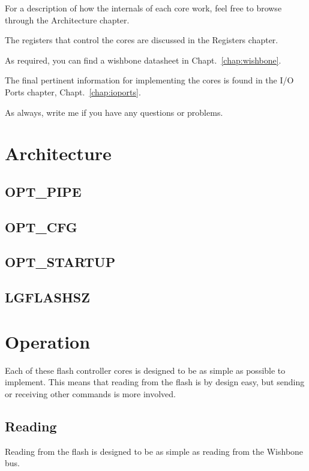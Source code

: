 \documentclass{gqtekspec}
\begin{document}
For a description of how the internals of each core work, feel free to browse
through the Architecture chapter.

The registers that control the cores are discussed in the Registers chapter.

As required, you can find a wishbone datasheet in Chapt.~\ref{chap:wishbone}.

The final pertinent information for implementing the cores is found in the
I/O Ports chapter, Chapt.~\ref{chap:ioports}.

As always, write me if you have any questions or problems.

\chapter{Architecture}\label{chap:arch}

\section{OPT\_PIPE}
\section{OPT\_CFG}
\section{OPT\_STARTUP}
\section{LGFLASHSZ}

\chapter{Operation}\label{chap:ops}

Each of these flash controller cores is designed to be as simple as possible
to implement.  This means that reading from the flash is by design easy,
but sending or receiving other commands is more involved.

\section{Reading}

Reading from the flash is designed to be as simple as reading from the
Wishbone bus.
\end{document}
